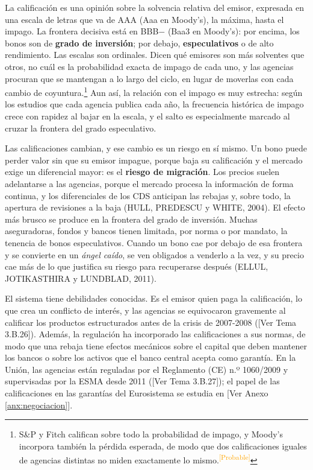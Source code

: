 \documentclass[10pt,a4paper]{article}
\newcommand{\authorfont}[1]{{\fontfamily{EBGaramond-TLF}\selectfont #1}}
\begin{document}
La calificación es una opinión sobre la solvencia relativa del emisor, expresada en una escala de letras que va de AAA (Aaa en Moody's), la máxima, hasta el impago. La frontera decisiva está en BBB$-$ (Baa3 en Moody's): por encima, los bonos son de \textbf{grado de inversión}; por debajo, \textbf{especulativos} o de alto rendimiento. Las escalas son ordinales. Dicen qué emisores son más solventes que otros, no cuál es la probabilidad exacta de impago de cada uno, y las agencias procuran que se mantengan a lo largo del ciclo, en lugar de moverlas con cada cambio de coyuntura.\footnote{%
    S\&P y Fitch califican sobre todo la probabilidad de impago, y Moody's incorpora también la pérdida esperada, de modo que dos calificaciones iguales de agencias distintas no miden exactamente lo mismo.\textcolor{orange}{\textsuperscript{[Probable]}}
} Aun así, la relación con el impago es muy estrecha: según los estudios que cada agencia publica cada año, la frecuencia histórica de impago crece con rapidez al bajar en la escala, y el salto es especialmente marcado al cruzar la frontera del grado especulativo.

Las calificaciones cambian, y ese cambio es un riesgo en sí mismo. Un bono puede perder valor sin que su emisor impague, porque baja su calificación y el mercado exige un diferencial mayor: es el \textbf{riesgo de migración}. Los precios suelen adelantarse a las agencias, porque el mercado procesa la información de forma continua, y los diferenciales de los CDS anticipan las rebajas y, sobre todo, la apertura de revisiones a la baja (HULL, PREDESCU y WHITE, 2004). El efecto más brusco se produce en la frontera del grado de inversión. Muchas aseguradoras, fondos y bancos tienen limitada, por norma o por mandato, la tenencia de bonos especulativos. Cuando un bono cae por debajo de esa frontera y se convierte en un \textit{ángel caído}, se ven obligados a venderlo a la vez, y su precio cae más de lo que justifica su riesgo para recuperarse después (ELLUL, JOTIKASTHIRA y LUNDBLAD, 2011).

El sistema tiene debilidades conocidas. Es el emisor quien paga la calificación, lo que crea un conflicto de interés, y las agencias se equivocaron gravemente al calificar los productos estructurados antes de la crisis de 2007-2008 ([\authorfont{Ver Tema 3.B.26}]). Además, la regulación ha incorporado las calificaciones a sus normas, de modo que una rebaja tiene efectos mecánicos sobre el capital que deben mantener los bancos o sobre los activos que el banco central acepta como garantía. En la Unión, las agencias están reguladas por el Reglamento (CE) n.º 1060/2009 y supervisadas por la ESMA desde 2011 ([\authorfont{Ver Tema 3.B.27}]); el papel de las calificaciones en las garantías del Eurosistema se estudia en [\authorfont{Ver Anexo \ref{anx:negociacion}}].
\end{document}
